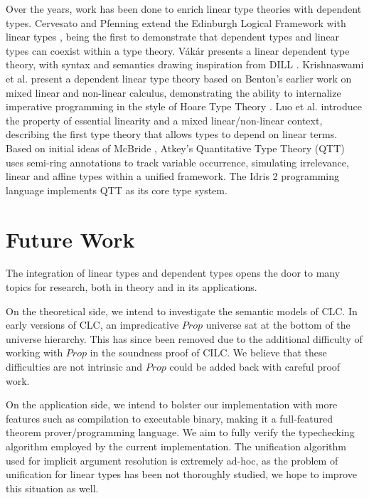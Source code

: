 \documentclass[sigplan,screen,review,authordraft]{acmart}
\begin{document}
Over the years, work has been done to enrich linear type theories with dependent types. Cervesato and Pfenning extend the Edinburgh Logical Framework with linear types \cite{lf,llf}, being the first to demonstrate that dependent types and linear types can coexist within a type theory. V\'{a}k\'{a}r \cite{vakar14} presents a linear dependent type theory, with syntax and semantics drawing inspiration from DILL \cite{dill}.  Krishnaswami et al. present a dependent linear type theory \cite{neel15} based on Benton's earlier work on mixed linear and non-linear calculus, demonstrating the ability to internalize imperative programming in the style of Hoare Type Theory \cite{htt}. Luo et al. \cite{luo} introduce the property of essential linearity and a mixed linear/non-linear context, describing the first type theory that allows types to depend on linear terms. Based on initial ideas of McBride \cite{nothing}, Atkey's Quantitative Type Theory (QTT) \cite{qtt} uses semi-ring annotations to track variable occurrence, simulating irrelevance, linear and affine types within a unified framework. The Idris 2 programming language \cite{idris2} implements QTT as its core type system.

\section{Future Work}
The integration of linear types and dependent types opens the door to many topics for research, both in theory and in its applications.

On the theoretical side, we intend to investigate the semantic models of CLC. In early versions of CLC, an impredicative $Prop$ universe sat at the bottom of the universe hierarchy. This has since been removed due to the additional difficulty of working with $Prop$ in the soundness proof of CILC. We believe that these difficulties are not intrinsic and $Prop$ could be added back with careful proof work.

On the application side, we intend to bolster our implementation with more features such as compilation to executable binary, making it a full-featured theorem prover/programming language. We aim to fully verify the typechecking algorithm employed by the current implementation. The unification algorithm used for implicit argument resolution is extremely ad-hoc, as the problem of unification for linear types has been not thoroughly studied, we hope to improve this situation as well.




\end{document}
